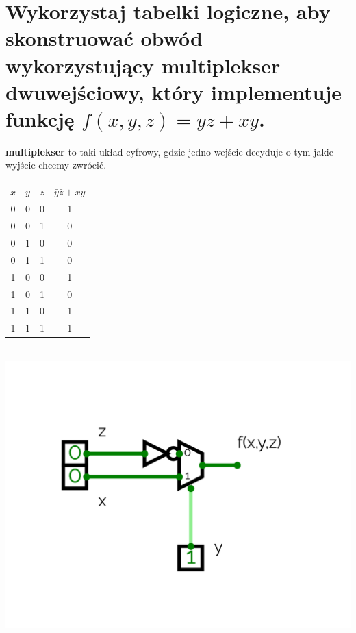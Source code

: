 \documentclass{article}
\begin{document}
\section{Wykorzystaj tabelki logiczne, aby skonstruować obwód wykorzystujący multiplekser dwuwejściowy, który implementuje funkcję $f(x, y, z) = \bar y\bar z + xy$.}
\textbf{multiplekser} to taki układ cyfrowy, gdzie jedno wejście decyduje o tym jakie wyjście chcemy zwrócić.
\begin{center}

\begin{tabular}{|c|c|c||c|} 
	 \hline
	$x$ & $y$ & $z$ & $\bar y\bar z + xy$\\ 
	 \hline \hline
	 0&0&0&1\\ \hline
	 0&0&1&0\\ \hline
	 0&1&0&0\\ \hline
	 0&1&1&0\\ \hline
	 1&0&0&1\\ \hline	 
	 1&0&1&0\\ \hline
	 1&1&0&1\\ \hline
	 1&1&1&1\\ \hline
\end{tabular}\\
	\includegraphics[scale=0.2]{./L04_Z02.png}
\end{center}
\end{document}
